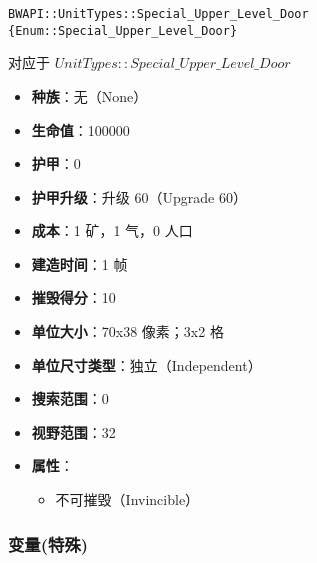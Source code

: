 \begin{tcolorbox}[colback=white, colframe=black!60!white, title=Special\_Upper\_Level\_Door(), arc=0mm]
    \begin{verbatim}
BWAPI::UnitTypes::Special_Upper_Level_Door {Enum::Special_Upper_Level_Door}
    \end{verbatim}
    对应于  $UnitTypes::Special\_Upper\_Level\_Door$ 
    \begin{itemize}
        \item \textbf{种族}：无（None）
        \item \textbf{生命值}：100000
        \item \textbf{护甲}：0
        \item \textbf{护甲升级}：升级 60（Upgrade 60）
        \item \textbf{成本}：1 矿，1 气，0 人口
        \item \textbf{建造时间}：1 帧
        \item \textbf{摧毁得分}：10
        \item \textbf{单位大小}：70x38 像素；3x2 格
        \item \textbf{单位尺寸类型}：独立（Independent）
        \item \textbf{搜索范围}：0
        \item \textbf{视野范围}：32
        \item \textbf{属性}：
            \begin{itemize}
                \item 不可摧毁（Invincible）
            \end{itemize}
    \end{itemize}
\end{tcolorbox}

\subsubsection{变量(特殊)}

